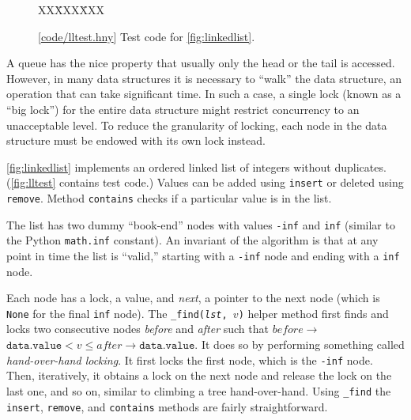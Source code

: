 \documentclass{report}
\newcommand{\harmonysource}[1]{
\begin{tabbing}
XX\=XXX\=XXX\kill
    
\end{tabbing}
}
\newcommand{\harmonylink}[1]{%
[\href{https://harmony.cs.cornell.edu/#1}{\underline{#1}}]%
}
\newenvironment{code}{
\tcolorbox
}{
\endtcolorbox
}
\begin{document}
\begin{figure}
\begin{code}
\harmonysource{lltest}
\end{code}
\caption{\harmonylink{code/lltest.hny} Test code for \autoref{fig:linkedlist}.}
\label{fig:lltest}
\end{figure}

%
%
%
%
A queue has the nice property that usually only the head or the tail is accessed.
However, in many data structures it is necessary to ``walk'' the data structure,
an operation that can take significant time.
In such a case, a single lock (known as a ``big lock'')
for the entire data structure might restrict concurrency to an unacceptable level.
To reduce the granularity of locking, each node in the data structure must be
endowed with its own lock instead.

\autoref{fig:linkedlist} implements an ordered linked
list of integers without duplicates.
(\autoref{fig:lltest} contains test code.)
Values can be added using \texttt{insert} or deleted using \texttt{remove}.
Method \texttt{contains} checks if a particular value is in the list.

The list has two dummy ``book-end'' nodes with values \texttt{-inf} and
\texttt{inf} (similar to the Python \texttt{math.inf} constant).
An invariant of the algorithm is that at any point in time the
list is ``valid,'' starting with a \texttt{-inf} node and ending
with a \texttt{inf} node.

%
Each node has a lock, a value, and \textit{next}, a pointer to the next node
(which is \texttt{None} for the final \texttt{inf} node).
The \texttt{\_find(\textit{lst}, $v$)} helper method first
finds and locks two consecutive nodes \textit{before} and \textit{after}
such that $\mathit{before}$$\rightarrow$$\mathtt{data.value} < v \le \mathit{after}$$\rightarrow$$\mathtt{data.value}$.
It does so by performing something called \emph{hand-over-hand locking}.
It first locks the first node, which is the \texttt{-inf} node.
Then, iteratively, it obtains a lock on the next node and release the
lock on the last one, and so on, similar to climbing a tree
hand-over-hand.
Using \texttt{\_find} the \texttt{insert}, \texttt{remove}, and \texttt{contains}
methods are fairly straightforward.
\end{document}
